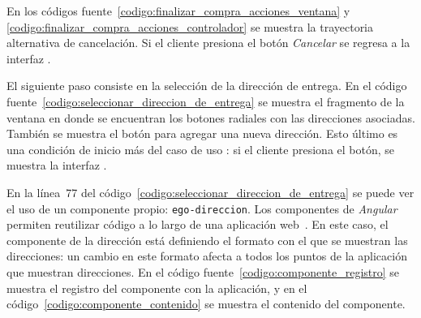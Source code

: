 

En los códigos fuente~\ref{codigo:finalizar_compra_acciones_ventana} y
\ref{codigo:finalizar_compra_acciones_controlador} se muestra la trayectoria
alternativa de cancelación. Si el cliente presiona el botón \textit{Cancelar}
se regresa a la interfaz .

El siguiente paso consiste en la selección de la dirección de entrega. En el
código fuente~\ref{codigo:seleccionar_direccion_de_entrega} se muestra el
fragmento de la ventana en donde se encuentran los botones radiales con las
direcciones asociadas. También se muestra el botón para agregar una nueva
dirección. Esto último es una condición de inicio más del caso de uso
: si el cliente presiona el
botón, se muestra la interfaz
.


En la línea~77 del código~\ref{codigo:seleccionar_direccion_de_entrega} se
puede ver el uso de un componente propio: \texttt{ego-direccion}. Los
componentes de \textit{Angular} permiten reutilizar código a lo largo de una
aplicación web~\cite{angular_componentes}. En este caso, el componente de la
dirección está definiendo el formato con el que se muestran las direcciones: un
cambio en este formato afecta a todos los puntos de la aplicación que muestran
direcciones. En el código fuente~\ref{codigo:componente_registro} se muestra el
registro del componente con la aplicación, y en el
código~\ref{codigo:componente_contenido} se muestra el contenido del componente.


